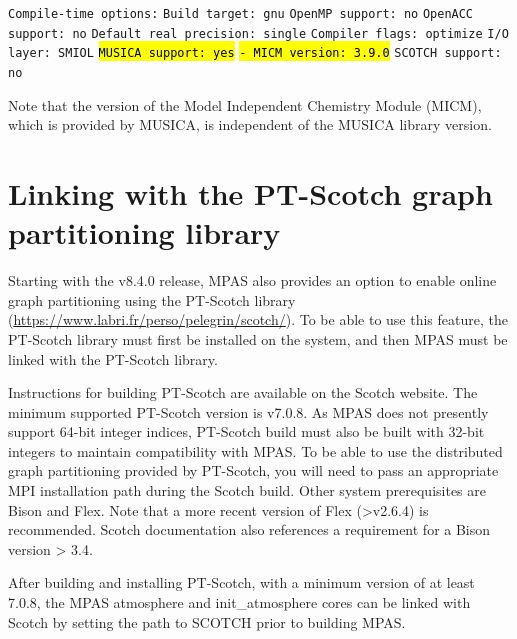 {\vspace{12pt}
\noindent
{\tt Compile-time options:} \newline
{\tt   Build target: gnu} \newline
{\tt   OpenMP support: no} \newline
{\tt   OpenACC support: no} \newline
{\tt   Default real precision: single} \newline
{\tt   Compiler flags: optimize} \newline
{\tt   I/O layer: SMIOL} \newline
{\tt   \hl{MUSICA support: yes}} \newline
{\tt   \hl{- MICM version: 3.9.0}} \newline
{\tt   SCOTCH support: no} \newline
\vspace{12pt}

\noindent Note that the version of the Model Independent Chemistry Module (MICM), which is provided by MUSICA, is independent of the MUSICA library version.

\section{Linking with the PT-Scotch graph partitioning library}
\label{sec:scotch_build}
Starting with the v8.4.0 release, MPAS also provides an option to enable online graph partitioning using the PT-Scotch library
(\url{https://www.labri.fr/perso/pelegrin/scotch/}). To be able to use this feature, the PT-Scotch library
must first be installed on the system, and then MPAS must be linked with the PT-Scotch library. 

Instructions for building PT-Scotch are available on the Scotch website. The minimum supported PT-Scotch version is v7.0.8. 
As MPAS does not presently support 64-bit integer indices, PT-Scotch build must also be built with 32-bit integers to maintain 
compatibility with MPAS. To be able to use the distributed graph partitioning provided by PT-Scotch, you will need to pass an appropriate MPI
installation path during the Scotch build. Other system prerequisites are Bison and Flex. Note that a more recent version of Flex (>v2.6.4) is recommended.
Scotch documentation also references a requirement for a Bison version > 3.4.

After building and installing PT-Scotch, with a minimum version of at least 7.0.8, the MPAS atmosphere
and init\_atmosphere cores can be linked with Scotch by setting the path to SCOTCH prior to building MPAS.

}
